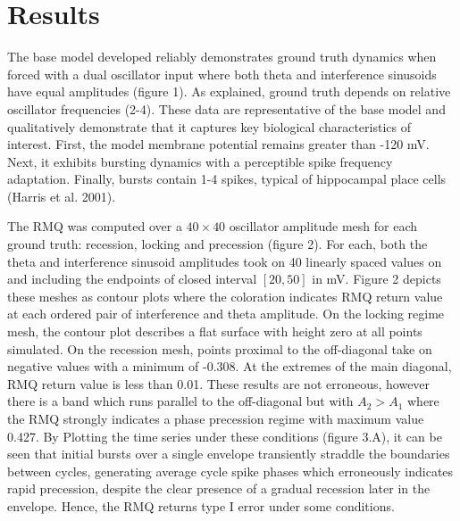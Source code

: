 \documentclass[12pt, letterpaper]{article}
\newenvironment{collapsable}{}{}
\begin{document}
\begin{collapsable}
  \section*{\normalfont\normalsize\bf Results}
  The base model developed reliably demonstrates ground truth dynamics when
  forced with a dual oscillator input where both theta and interference
  sinusoids have equal amplitudes (figure 1). As explained, ground truth depends on
  relative oscillator frequencies (2-4). These data are representative of the
  base model and qualitatively demonstrate that it captures key biological
  characteristics of interest. First, the model membrane potential remains
  greater than -120 mV. Next, it exhibits bursting dynamics with a perceptible
  spike frequency adaptation. Finally, bursts contain 1-4 spikes, typical
  of hippocampal place cells (Harris et al. 2001).

  \vspace{12pt}

  The RMQ was computed over a $40\times 40$ oscillator amplitude mesh for each
  ground truth: recession, locking and precession (figure 2). For each, both the theta and
  interference sinusoid amplitudes took on 40 linearly spaced values on and
  including the endpoints of closed interval $[20, 50]$ in mV. Figure 2 depicts
  these meshes as contour plots where the coloration indicates RMQ return value
  at each ordered pair of interference and theta amplitude. On the locking
  regime mesh, the contour plot describes a flat surface with height zero at all
  points simulated. On the recession mesh, points proximal to the off-diagonal
  take on negative values with a minimum of -0.308. At the extremes of the main
  diagonal, RMQ return value is less than 0.01. These results are not erroneous,
  however there is a band which runs parallel to the off-diagonal but with
  $A_2>A_1$ where the RMQ strongly indicates a phase precession regime with
  maximum value 0.427. By Plotting the time series under these conditions
  (figure 3.A), it can be seen that initial bursts over a single envelope transiently straddle
  the boundaries between cycles, generating average cycle spike phases
  which erroneously indicates rapid precession, despite the clear presence of a
  gradual recession later in the envelope. Hence, the RMQ returns type I error
  under some conditions.

  \vspace{12pt}


\end{collapsable}
\end{document}
